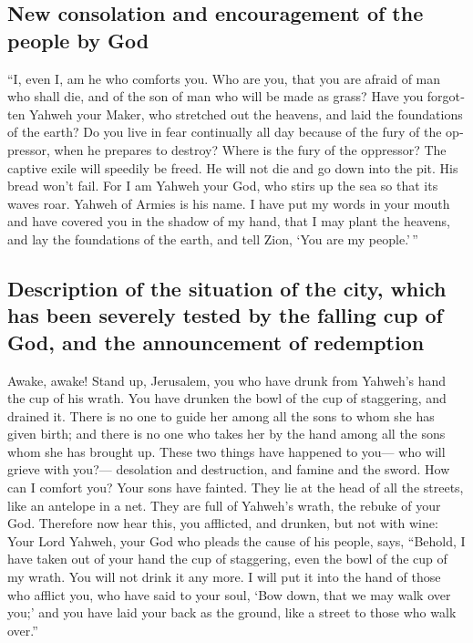 \begin{paracol}{2}
\begin{otherlanguage}{english}
{\subsection{New consolation and encouragement of the people by
God}\label{new-consolation-and-encouragement-of-the-people-by-god}}

 ``I, even I, am he who comforts you. Who are you, that
you are afraid of man who shall die, and of the son of man who will be
made as grass?  Have you forgotten Yahweh your Maker, who
stretched out the heavens, and laid the foundations of the earth? Do you
live in fear continually all day because of the fury of the oppressor,
when he prepares to destroy? Where is the fury of the oppressor?
 The captive exile will speedily be freed. He will not
die and go down into the pit. His bread won't fail.  For
I am Yahweh your God, who stirs up the sea so that its waves roar.
Yahweh of Armies is his name.  I have put my words in
your mouth and have covered you in the shadow of my hand, that I may
plant the heavens, and lay the foundations of the earth, and tell Zion,
`You are my people.'\,''

\hypertarget{description-of-the-situation-of-the-city-which-has-been-severely-tested-by-the-falling-cup-of-god-and-the-announcement-of-redemption}{%
\subsection{Description of the situation of the city, which has been
severely tested by the falling cup of God, and the announcement of
redemption}\label{description-of-the-situation-of-the-city-which-has-been-severely-tested-by-the-falling-cup-of-god-and-the-announcement-of-redemption}}

 Awake, awake! Stand up, Jerusalem, you who have drunk
from Yahweh's hand the cup of his wrath. You have drunken the bowl of
the cup of staggering, and drained it.  There is no one
to guide her among all the sons to whom she has given birth; and there
is no one who takes her by the hand among all the sons whom she has
brought up.  These two things have happened to you--- who
will grieve with you?--- desolation and destruction, and famine and the
sword. How can I comfort you?  Your sons have fainted.
They lie at the head of all the streets, like an antelope in a net. They
are full of Yahweh's wrath, the rebuke of your God. 
Therefore now hear this, you afflicted, and drunken, but not with wine:
 Your Lord Yahweh, your God who pleads the cause of his
people, says, ``Behold, I have taken out of your hand the cup of
staggering, even the bowl of the cup of my wrath. You will not drink it
any more.  I will put it into the hand of those who
afflict you, who have said to your soul, `Bow down, that we may walk
over you;' and you have laid your back as the ground, like a street to
those who walk over.''


\end{otherlanguage}
\end{paracol}
